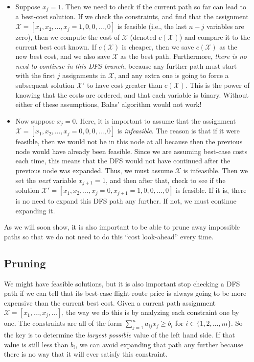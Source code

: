 \documentclass{article}
\begin{document}
\begin{itemize}[noitemsep]
    \item Suppose $x_j = 1$. Then we need to check if the current path so far can lead to a best-cost solution. If we check the constraints, and find
    that the assignment $\mathcal{X} = [x_1,x_2,\ldots,x_j=1, 0, 0, \ldots, 0]$ is feasible (i.e., the last $n-j$ variables are zero), then we compute
    the cost of $\mathcal{X}$ (denoted $c(\mathcal{X})$) and compare it to the current best cost known. If $c(\mathcal{X})$ is cheaper, then we save
    $c(\mathcal{X})$ as the new best cost, and we also save $\mathcal{X}$ as the best path. Furthermore, \emph{there is no need to continue in this
    DFS branch}, because any further path must start with the first $j$ assignments in $\mathcal{X}$, and any extra one is going to force a subsequent
    solution $\mathcal{X}'$ to have cost greater than $c(\mathcal{X})$. This is the power of knowing that the costs are ordered, and that each
    variable is binary. Without either of these assumptions, Balas' algorithm would not work!
    \item Now suppose $x_j = 0$. Here, it is important to assume that the assignment $\mathcal{X} = [x_1,x_2,\ldots,x_j=0,0,0,\ldots, 0]$ is
    \emph{infeasible}. The reason is that if it were feasible, then we would not be in this node at all because then the previous node would have
    already been feasible. Since we are assuming best-case costs each time, this means that the DFS would not have continued after the previous node
    was expanded. Thus, we must assume $\mathcal{X}$ is infeasible. Then we set the \emph{next} variable $x_{j+1} = 1$, and then after that, check to
    see if the solution $\mathcal{X}' = [x_1,x_2,\ldots,x_j=0,x_{j+1}=1,0,0,\ldots,0]$ is feasible. If it is, there is no need to expand this DFS path
    any further. If not, we must continue expanding it.
\end{itemize}

As we will soon show, it is also important to be able to prune away impossible paths so that we do not need to do this ``cost look-ahead'' every time.

\subsection{Pruning}

We might have feasible solutions, but it is also important stop checking a DFS path if we can tell that its best-case flight route price is always
going to be more expensive than the current best cost. Given a current path assignment $\mathcal{X} = [x_1,\ldots, x_j, \ldots]$, the way we do this
is by analyzing each constraint one by one. The constraints are all of the form $\sum_{j=1}^{n} a_{ij}x_j \ge b_i$ for $i \in \{1,2,\ldots,m\}$. So
the key is to determine the \emph{largest possible} value of the left hand side. If that value is still less than $b_i$, we can avoid expanding that
path any further because there is no way that it will ever satisfy this constraint.
\end{document}
